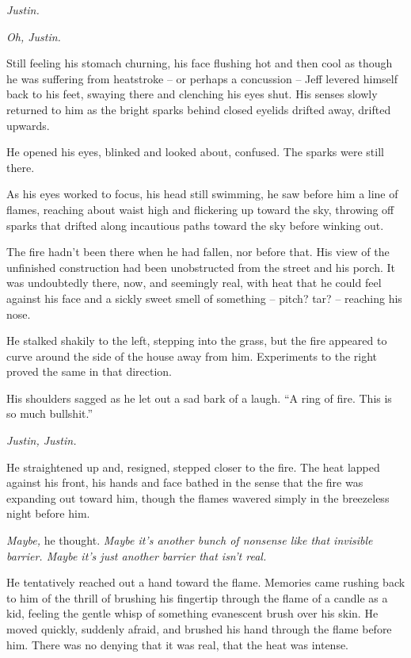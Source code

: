 \textit{Justin.}

\textit{Oh, Justin.}

\secdiv

Still feeling his stomach churning, his face flushing hot and then cool as though he was suffering from heatstroke -- or perhaps a concussion -- Jeff levered himself back to his feet, swaying there and clenching his eyes shut.  His senses slowly returned to him as the bright sparks behind closed eyelids drifted away, drifted upwards.

He opened his eyes, blinked and looked about, confused.  The sparks were still there.

As his eyes worked to focus, his head still swimming, he saw before him a line of flames, reaching about waist high and flickering up toward the sky, throwing off sparks that drifted along incautious paths toward the sky before winking out.

The fire hadn't been there when he had fallen, nor before that.  His view of the unfinished construction had been unobstructed from the street and his porch.  It was undoubtedly there, now, and seemingly real, with heat that he could feel against his face and a sickly sweet smell of something -- pitch? tar? -- reaching his nose.

He stalked shakily to the left, stepping into the grass, but the fire appeared to curve around the side of the house away from him.  Experiments to the right proved the same in that direction.

His shoulders sagged as he let out a sad bark of a laugh.  ``A ring of fire.  This is so much bullshit.''

\textit{Justin, Justin.}

He straightened up and, resigned, stepped closer to the fire.  The heat lapped against his front, his hands and face bathed in the sense that the fire was expanding out toward him, though the flames wavered simply in the breezeless night before him.

\textit{Maybe,} he thought. \textit{Maybe it's another bunch of nonsense like that invisible barrier.  Maybe it's just another barrier that isn't real.}

He tentatively reached out a hand toward the flame.  Memories came rushing back to him of the thrill of brushing his fingertip through the flame of a candle as a kid, feeling the gentle whisp of something evanescent brush over his skin.  He moved quickly, suddenly afraid, and brushed his hand through the flame before him.  There was no denying that it was real, that the heat was intense.


